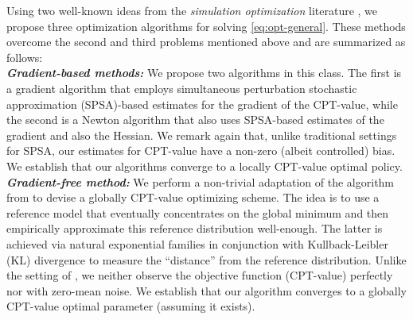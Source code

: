 \documentclass[11pt,letterpaper,english]{article}
\begin{document}
Using two well-known ideas from the \textit{simulation optimization} literature \cite{fu2015handbook}, we propose three optimization algorithms for solving \eqref{eq:opt-general}. These methods overcome the second and third problems mentioned above and are summarized as follows:\\
\textbf{\textit{Gradient-based methods:}} We propose two algorithms in this class. The first is a gradient algorithm that employs simultaneous perturbation stochastic approximation (SPSA)-based estimates for the gradient of the CPT-value, while the second is a Newton algorithm that also uses SPSA-based estimates of the gradient and also the Hessian. We remark again that, unlike traditional settings for SPSA, our estimates for CPT-value have a non-zero (albeit controlled) bias. We establish that our algorithms converge to a locally CPT-value optimal policy. \\
\textbf{\textit{Gradient-free method:}} We perform a non-trivial adaptation of the algorithm from \cite{chang2013simulation} to devise a globally CPT-value optimizing scheme. The idea is to use a reference model that eventually concentrates on the global minimum and then empirically approximate this reference distribution well-enough. The latter is achieved via natural exponential families in conjunction with Kullback-Leibler (KL) divergence to measure the ``distance'' from the reference distribution. Unlike the setting of \cite{chang2013simulation}, we neither observe the objective function (CPT-value) perfectly nor with zero-mean noise. We establish that our algorithm converges to a globally CPT-value optimal parameter (assuming it exists).
\end{document}
